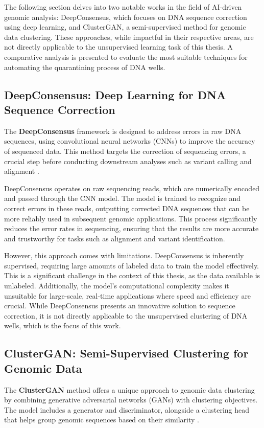 The following section delves into two notable works in the field of AI-driven genomic analysis: DeepConsensus, which focuses on DNA sequence correction using deep learning, and ClusterGAN, a semi-supervised method for genomic data clustering. These approaches, while impactful in their respective areas, are not directly applicable to the unsupervised learning task of this thesis. A comparative analysis is presented to evaluate the most suitable techniques for automating the quarantining process of DNA wells.

\subsection{DeepConsensus: Deep Learning for DNA Sequence Correction}
The \textbf{DeepConsensus} framework is designed to address errors in raw DNA sequences, using convolutional neural networks (CNNs) to improve the accuracy of sequenced data. This method targets the correction of sequencing errors, a crucial step before conducting downstream analyses such as variant calling and alignment \cite{deepconsensus}.

DeepConsensus operates on raw sequencing reads, which are numerically encoded and passed through the CNN model. The model is trained to recognize and correct errors in these reads, outputting corrected DNA sequences that can be more reliably used in subsequent genomic applications. This process significantly reduces the error rates in sequencing, ensuring that the results are more accurate and trustworthy for tasks such as alignment and variant identification.

However, this approach comes with limitations. DeepConsensus is inherently supervised, requiring large amounts of labeled data to train the model effectively. This is a significant challenge in the context of this thesis, as the data available is unlabeled. Additionally, the model's computational complexity makes it unsuitable for large-scale, real-time applications where speed and efficiency are crucial. While DeepConsensus presents an innovative solution to sequence correction, it is not directly applicable to the unsupervised clustering of DNA wells, which is the focus of this work.

\subsection{ClusterGAN: Semi-Supervised Clustering for Genomic Data}
The \textbf{ClusterGAN} method offers a unique approach to genomic data clustering by combining generative adversarial networks (GANs) with clustering objectives. The model includes a generator and discriminator, alongside a clustering head that helps group genomic sequences based on their similarity \cite{clustergan}.

